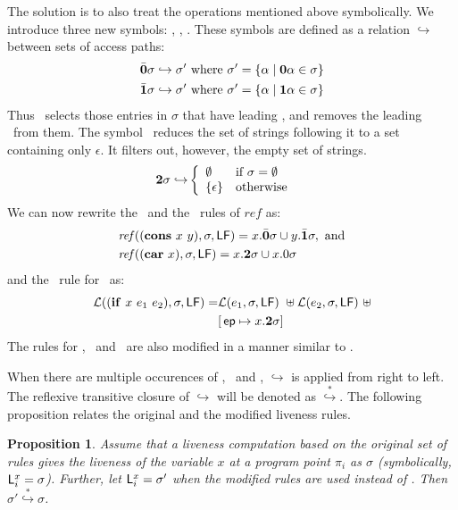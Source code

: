 \documentclass[9pt]{sigplanconf}
\newtheorem{proposition}[theorem]{Proposition}
\begin{document}
The  solution  is  to  also   treat  the  operations  mentioned  above
symbolically.  We  introduce three new symbols:  \bcar, \bcdr, \clazy.
These symbols are defined as a relation $\hookrightarrow$ between sets
of access paths:
\begin{align*}
  &\bar{\mathbf{0}}\sigma \hookrightarrow \sigma' \mbox{ where } \sigma' = \{\alpha \mid \mathbf{0}\alpha \in \sigma\}\\
  &\bar{\mathbf{1}}\sigma \hookrightarrow \sigma' \mbox{ where } \sigma' = \{\alpha \mid \mathbf{1}\alpha \in \sigma\}
\end{align*}
Thus \bcar\ selects those entries in $\sigma$ that have leading \acar, and removes the leading \acar\ from them.
The symbol \clazy\ reduces the set of strings following it to a set containing only $\epsilon$. It filters out, however, the empty set of strings.
\begin{align*}
  {\mathbf{2}}\sigma \hookrightarrow & \left\{ 
  \begin{array}{ll}
    \emptyset&\mbox{if}~\sigma = \emptyset\\
    \{\epsilon\} & \mbox{otherwise}
  \end{array}\right.
\end{align*}
We can  now rewrite the \CONS\  and the \CAR\  rules of $\mathit{ref}$
as:
\begin{align*}
&\mathit{ref\/}((\mbox{$\mathbf{cons}$}~x~y),\sigma,\mathsf{LF})
= x.\bar{\mathbf{0}}\sigma \cup y.\bar{\mathbf{1}}\sigma  \label{eqn:mod-cons},~
\mbox{and} \\
&\mathit{ref\/}((\mbox{$\mathbf{car}$}~x),\sigma,\mathsf{LF})
          =   x.{\mathbf{2}}\sigma \cup x.0\sigma
\end{align*}
and the \Lfunonly\ rule
for \SIF\ as:
\begin{align*}
\mathcal{L}((\mbox{$\mathbf{ if}$}~x~e_1~e_2),\sigma,\mathsf{LF}) =
                    &\mathcal{L}(e_1,\sigma,\mathsf{LF})~\uplus
        \mathcal{L}(e_2,\sigma,\mathsf{LF})~\uplus\\
        &[\,\mathit{\mathsf{ep}} \mapsto  x.{\mathbf{2}} \sigma]
\end{align*}
The rules for  \CDR, \PRIM\ and \NULLQ\ are also  modified in a manner
similar to \CAR. 

When  there  are  multiple  occurences of  \bcar,  \bcdr\  and  \clazy,
$\hookrightarrow$  is  applied  from  right to  left.   The  reflexive
transitive   closure  of   $\hookrightarrow$   will   be  denoted   as
$\stackrel{*}{\hookrightarrow}$.   The  following proposition  relates
the original and the modified liveness rules.
\begin{proposition}
Assume that a liveness computation  based on the original set of rules
gives the liveness  of the variable $x$ at a  program point $\pi_i$ as
$\sigma$   (symbolically,   $\mathsf{L}_{{i}}^{x}=   \sigma$).   Further,   let
$\mathsf{L}_{{i}}^{x}=  \sigma'$ when the  modified rules  are used  instead of
\Lfunonly.  Then $\sigma' \stackrel{*}{\hookrightarrow} \sigma$.
\end{proposition}
\end{document}
